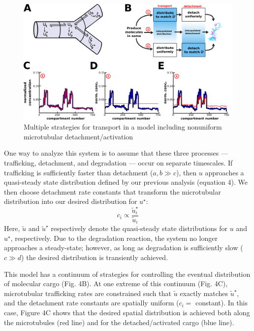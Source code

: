 \documentclass[11pt]{wlpeerj}
\begin{document}
\begin{figure}[!tb]
\begin{center}
\includegraphics[width=0.9\columnwidth]{04_sushi_belt.png}
\caption{Multiple strategies for transport in a model including nonuniform microtubular detachment/activation}
\end{center}
\end{figure}

One way to analyze this system is to assume that these three processes --- trafficking, detachment, and degradation --- occur on separate timescales.
If trafficking is sufficiently faster than detachment ($a,b \gg c$), then $u$ approaches a quasi-steady state distribution defined by our previous analysis (equation 4).
We then choose detachment rate constants that transform the microtubular distribution into our desired distribution for $u^\star$:
\begin{equation}
c_i \propto \frac{\tilde{u}^\star_i}{\tilde{u}_i}
\end{equation}
Here, $\tilde{u}$ and $\tilde{u}^\star$ respectively denote the quasi-steady state distributions for $u$ and $u^\star$, respectively.
Due to the degradation reaction, the system no longer approaches a steady-state; however, as long as degradation is sufficiently slow ($c \gg d$) the desired distribution is transiently achieved.

This model has a continuum of strategies for controlling the eventual distribution of molecular cargo (Fig. 4B).
At one extreme of this continuum (Fig. 4C), microtubular trafficking rates are constrained such that $\tilde{u}$ exactly matches $\tilde{u}^\star$, and the detachment rate constants are spatially uniform ($c_i =$ constant).
In this case, Figure 4C shows that the desired spatial distribution is achieved both along the microtubules (red line) and for the detached/activated cargo (blue line).
\end{document}
